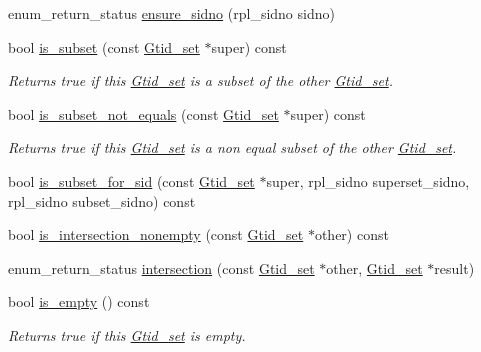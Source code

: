 \begin{DoxyCompactItemize}
enum\+\_\+return\+\_\+status \mbox{\hyperlink{classGtid__set_a4f026631d33627a5c273bdc35dcc03ef}{ensure\+\_\+sidno}} (rpl\+\_\+sidno sidno)
\item 
\mbox{\label{classGtid__set_a0fe2143cf922ad18d4d92853d439796b}} 
bool \mbox{\hyperlink{classGtid__set_a0fe2143cf922ad18d4d92853d439796b}{is\+\_\+subset}} (const \mbox{\hyperlink{classGtid__set}{Gtid\+\_\+set}} $\ast$super) const
\begin{DoxyCompactList}\small\item\em Returns true if this \mbox{\hyperlink{classGtid__set}{Gtid\+\_\+set}} is a subset of the other \mbox{\hyperlink{classGtid__set}{Gtid\+\_\+set}}. \end{DoxyCompactList}\item 
\mbox{\label{classGtid__set_aaa735cb7bf13a930a11ea4ca69ffa763}} 
bool \mbox{\hyperlink{classGtid__set_aaa735cb7bf13a930a11ea4ca69ffa763}{is\+\_\+subset\+\_\+not\+\_\+equals}} (const \mbox{\hyperlink{classGtid__set}{Gtid\+\_\+set}} $\ast$super) const
\begin{DoxyCompactList}\small\item\em Returns true if this \mbox{\hyperlink{classGtid__set}{Gtid\+\_\+set}} is a non equal subset of the other \mbox{\hyperlink{classGtid__set}{Gtid\+\_\+set}}. \end{DoxyCompactList}\item 
bool \mbox{\hyperlink{classGtid__set_a75513b924941cde711e91e8c0f9275a0}{is\+\_\+subset\+\_\+for\+\_\+sid}} (const \mbox{\hyperlink{classGtid__set}{Gtid\+\_\+set}} $\ast$super, rpl\+\_\+sidno superset\+\_\+sidno, rpl\+\_\+sidno subset\+\_\+sidno) const
\item 
bool \mbox{\hyperlink{classGtid__set_a09f59bb7b9cd3a32b54bb5f8128aa5ca}{is\+\_\+intersection\+\_\+nonempty}} (const \mbox{\hyperlink{classGtid__set}{Gtid\+\_\+set}} $\ast$other) const
\item 
enum\+\_\+return\+\_\+status \mbox{\hyperlink{classGtid__set_a9a384be7c735d018d5fc0c8c0c64344e}{intersection}} (const \mbox{\hyperlink{classGtid__set}{Gtid\+\_\+set}} $\ast$other, \mbox{\hyperlink{classGtid__set}{Gtid\+\_\+set}} $\ast$result)
\item 
\mbox{\label{classGtid__set_abba037b0972b58d2be314c76cffef66d}} 
bool \mbox{\hyperlink{classGtid__set_abba037b0972b58d2be314c76cffef66d}{is\+\_\+empty}} () const
\begin{DoxyCompactList}\small\item\em Returns true if this \mbox{\hyperlink{classGtid__set}{Gtid\+\_\+set}} is empty. \end{DoxyCompactList}\item 

\end{DoxyCompactItemize}
